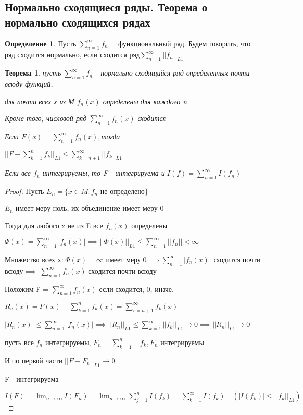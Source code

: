 \documentclass[a4paper]{article}
\newtheorem{theorem}{Теорема}[section]
\theoremstyle{definition}
\newtheorem*{definition}{Определение}
\theoremstyle{remark}
\begin{document}
    \subsection{ Нормально сходящиеся ряды. Теорема о нормально сходящихся рядах}
    \begin{definition}
     Пусть $\sum_{n = 1}^{\infty} f_n$ = функциональный ряд. Будем говорить, что ряд сходится нормально, если сходится ряд$\sum_{n = 1}^{\infty} ||f_n||_{L1}  $
\end{definition}
\begin{theorem}
     пусть $\sum_{n = 1}^{\infty} f_n$ - нормально сходящийся ряд определенных почти всюду функций,

     для почти всех х из М $f_n(x)$ определены для каждого n

     Кроме того, числовой ряд $\sum_{n = 1}^{\infty} f_n(x)$ сходится

     Если $F(x)=\sum_{n = 1}^{\infty} f_n(x), $тогда

     $||F - \sum_{k =1}^{n} f_k ||_{L1}\leq \sum_{k = n+ 1}^{\infty} ||f_k||_{L1} $

     Если все $f_n$ интегрируемы, то F - интегрируема и 
     $I(f) = \sum_{n = 1}^{\infty} I(f_n) $
\end{theorem}
\begin{proof}
     Пусть $E_n = \{x\in M : f_n$ не определено$\}$
     
     $E_n$ имеет меру ноль, их объединение имеет меру 0

     Тогда для любого x не из E все $f_n(x)$ определены
     
     $\Phi(x) =\sum_{n = 1}^{\infty} |f_n(x)| \implies ||\Phi(x)||_{L1}\leq \sum_{n = 1}^{\infty} ||f_n|| < \infty$

     Множество всех х: $\Phi(x)=\infty$ имеет меру $0\implies\sum_{n = 1}^{\infty} |f_n(x)|$ сходится почти всюду$\implies$
     $\sum_{n = 1}^{\infty} f_n(x)$ сходится почти всюду

     Положим F = $\sum_{n = 1}^{\infty} f_n(x)$ если сходится, 0, иначе.

     $R_n(x) = F(x) - \sum_{k = 1}^{n} f_k(x)  = \sum_{r = n+1}^{\infty}  f_k(x)$

     $|R_n(x)|\leq \sum_{n = 1}^{\infty} |f_n(x)|\implies ||R_n||_{L1}\leq \sum_{k = 1}^{\infty} ||f_k||_{L1}\to 0\implies ||R_n||_{L1} \to 0$
     
     пусть все $f_n$ интегрируемы, $F_n =\sum_{k = 1}^{n}\quad  f_k, F_n$ интегрируемы
     
     И по первой части $||F- F_n||_{L1} \to 0$

     F - интегрируема 

     $I(F) = \lim_{n\to \infty} I(F_n)= \lim_{n\to\infty}\sum_{j = 1}^{n} I(f_k) = \sum_{k = 1}^{\infty} I(f_k) \quad(|I(f_k)|\leq ||f_k||_{L1}) $
\end{proof}
\end{document}
